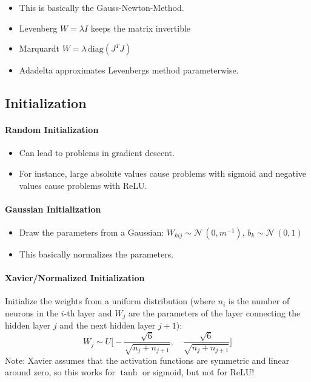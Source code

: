 				\begin{itemize}
					\item This is basically the Gauss-Newton-Method.
					\item Levenberg \( W = \lambda I \) keeps the matrix invertible
					\item Marquardt \( W = \lambda \, \textrm{diag}(J^T J) \)
					\item Adadelta approximates Levenbergs method parameterwise.
				\end{itemize}

		\subsection{Initialization}
			\paragraph{Random Initialization}
				\begin{itemize}
					\item Can lead to problems in gradient descent.
					\item For instance, large absolute values cause problems with sigmoid and negative values cause problems with ReLU.
				\end{itemize}

			\paragraph{Gaussian Initialization}
				\begin{itemize}
					\item Draw the parameters from a Gaussian: \( W_{kij} \sim \mathcal{N}\,(0, m^{-1}) \), \( b_k \sim \mathcal{N}\,(0, 1) \)
					\item This basically normalizes the parameters.
				\end{itemize}

			\paragraph{Xavier/Normalized Initialization}
				Initialize the weights from a uniform distribution (where \(n_i\) is the number of neurons in the \(i\)-th layer and \(W_j\) are the parameters of the layer connecting the hidden layer \(j\) and the next hidden layer \(j + 1\)):
				\begin{equation}
					W_j \sim U\Bigg[ -\frac{\sqrt{6}}{\sqrt{n_j + n_{j + 1}}}, \quad \frac{\sqrt{6}}{\sqrt{n_j + n_{j + 1}}} \Bigg]
				\end{equation}
				Note: Xavier assumes that the activation functions are symmetric and linear around zero, so this works for \(\tanh\) or sigmoid, but not for ReLU!

